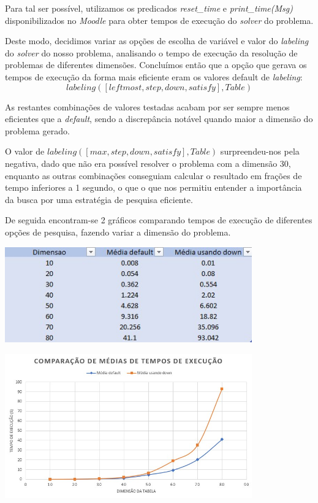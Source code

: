 \documentclass[11pt]{article}
\begin{document}
Para tal ser possível, utilizamos os predicados \emph{reset\_time} e \emph{print\_time(Msg)} disponibilizados no \emph{Moodle} para obter tempos de execução do \emph{solver} do problema.

Deste modo, decidimos variar as opções de escolha de variável e valor do \emph{labeling} do \emph{solver} do nosso problema, analisando o tempo de execução da resolução de problemas de diferentes dimensões.
Concluímos então que a opção que gerava os tempos de execução da forma mais eficiente eram os valores default de \emph{labeling}:  \[labeling([leftmost, step, down, satisfy],Table)\]

As restantes combinações de valores testadas acabam por ser sempre menos eficientes que a \emph{default}, sendo a discrepância notável quando maior a dimensão do problema gerado.

O valor de \(labeling([max, step, down, satisfy],Table)\) surpreendeu-nos pela negativa, dado que não era possível resolver o problema com a dimensão 30, enquanto as outras combinações conseguiam calcular o resultado em frações de tempo inferiores a 1 segundo, o que o que nos permitiu entender a importância da busca por uma estratégia de pesquisa eficiente.

De seguida encontram-se 2 gráficos comparando tempos de execução de diferentes opções de pesquisa, fazendo variar a dimensão do problema.

\bigskip

\begin{center}

	\includegraphics[width=0.8\textwidth]{tabela-comparacao.jpg}

	\includegraphics[width=0.8\textwidth]{grafico-comparacao.jpg}

\end{center}
\end{document}
